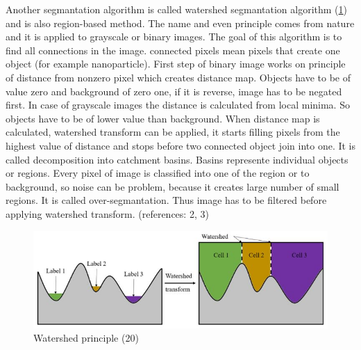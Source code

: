\documentclass[a4paper,12pt]{article}   %
\numberwithin{equation}{section}        %
\begin{document}
        Another segmantation algorithm is called watershed segmantation algorithm (\ref{fig:watershed}) and is also region-based method. The name and even principle comes from nature and it is applied
        to grayscale or binary images. The goal of this algorithm is to find all connections in the image. connected pixels mean pixels that create one object (for example nanoparticle).
        First step of binary image works on principle of distance from nonzero pixel which creates distance map. Objects have to be of value zero and background of zero one,
        if it is reverse, image has to be negated first. In case of grayscale images the distance is calculated from local minima. So objects have to be of lower value than background.
        When distance map is calculated, watershed transform can be applied, it starts filling pixels from the highest value of distance and stops before two connected object join into one.
        It is called decomposition into catchment basins. Basins represente individual objects or regions. Every pixel of image is classified into one of the region or to background,
        so noise can be problem, because it creates large number of small regions. It is called over-segmantation. Thus image has to be filtered before applying watershed transform.
        (references: 2, 3)
        
        \begin{figure}[h]
            \includegraphics[width=\linewidth]{watershed.jpg}
            \caption{Watershed principle (20)}
            \label{fig:watershed}
        \end{figure}
\end{document}
